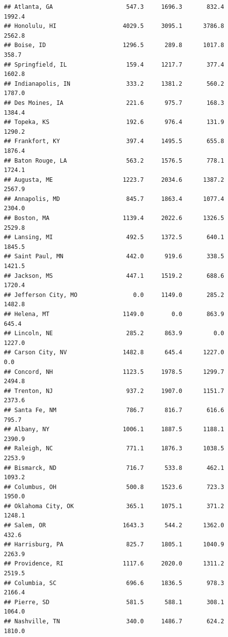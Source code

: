 \documentclass[
]{article}
\begin{document}
\begin{verbatim}
## Atlanta, GA                     547.3     1696.3       832.4          1992.4
## Honolulu, HI                   4029.5     3095.1      3786.8          2562.8
## Boise, ID                      1296.5      289.8      1017.8           358.7
## Springfield, IL                 159.4     1217.7       377.4          1602.8
## Indianapolis, IN                333.2     1381.2       560.2          1787.0
## Des Moines, IA                  221.6      975.7       168.3          1384.4
## Topeka, KS                      192.6      976.4       131.9          1290.2
## Frankfort, KY                   397.4     1495.5       655.8          1876.4
## Baton Rouge, LA                 563.2     1576.5       778.1          1724.1
## Augusta, ME                    1223.7     2034.6      1387.2          2567.9
## Annapolis, MD                   845.7     1863.4      1077.4          2304.0
## Boston, MA                     1139.4     2022.6      1326.5          2529.8
## Lansing, MI                     492.5     1372.5       640.1          1845.5
## Saint Paul, MN                  442.0      919.6       338.5          1421.5
## Jackson, MS                     447.1     1519.2       688.6          1720.4
## Jefferson City, MO                0.0     1149.0       285.2          1482.8
## Helena, MT                     1149.0        0.0       863.9           645.4
## Lincoln, NE                     285.2      863.9         0.0          1227.0
## Carson City, NV                1482.8      645.4      1227.0             0.0
## Concord, NH                    1123.5     1978.5      1299.7          2494.8
## Trenton, NJ                     937.2     1907.0      1151.7          2373.6
## Santa Fe, NM                    786.7      816.7       616.6           795.7
## Albany, NY                     1006.1     1887.5      1188.1          2390.9
## Raleigh, NC                     771.1     1876.3      1038.5          2253.9
## Bismarck, ND                    716.7      533.8       462.1          1093.2
## Columbus, OH                    500.8     1523.6       723.3          1950.0
## Oklahoma City, OK               365.1     1075.1       371.2          1248.1
## Salem, OR                      1643.3      544.2      1362.0           432.6
## Harrisburg, PA                  825.7     1805.1      1040.9          2263.9
## Providence, RI                 1117.6     2020.0      1311.2          2519.5
## Columbia, SC                    696.6     1836.5       978.3          2166.4
## Pierre, SD                      581.5      588.1       308.1          1064.0
## Nashville, TN                   340.0     1486.7       624.2          1810.0

\end{verbatim}
\end{document}
